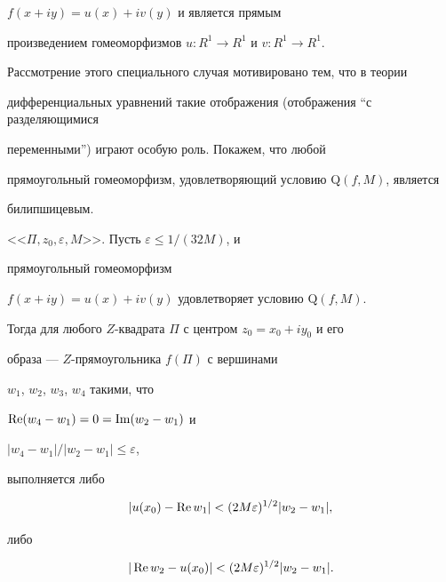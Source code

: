 $f(x+iy)= u(x)+i v(y)$ и является прямым 


произведением гомеоморфизмов $u: R^1 \to R^1$ и $v: R^1 \to R^1$. 


Рассмотрение этого специального случая мотивировано тем, что в теории 


дифференциальных уравнений такие отображения (отображения ``с разделяющимися 


переменными'') играют особую роль. Покажем, что любой 


прямоугольный гомеоморфизм, удовлетворяющий условию Q$(f,M)$, является 


билипшицевым.





\begin{lems}


<<$\Pi, z_0, \varepsilon, M$>>. Пусть $\varepsilon \leq 1/(32M)$, и 


прямоугольный гомеоморфизм 


$f(x+iy) = u(x) + iv(y)$ удовлетворяет условию $\mathrm Q(f,M)$. 


Тогда для любого $Z$-квадрата $\Pi$ с центром $z_0 = x_0 + iy_0$ и его 


образа --- $Z$-прямоугольника $f(\Pi)$ с вершинами 


$w_1$, $w_2$, $w_3$, $w_4$ такими, что 


$\operatorname{Re}(w_4 - w_1) = 0 = \operatorname{Im}(w_2 - w_1)$ и


$|w_4 - w_1|/|w_2 - w_1| \leq \varepsilon$, 


выполняется либо 


\begin{equation}


\label{vr.1}


|u(x_0) - \re w_1| < (2M\varepsilon)^{1/2} |w_2 - w_1|,


\end{equation}


либо 


\begin{equation} 


\label{vr.2}


|\re w_2 - u(x_0)| < 


(2M\varepsilon)^{1/2} |w_2 - w_1|.


\end{equation} 


\end{lems}





